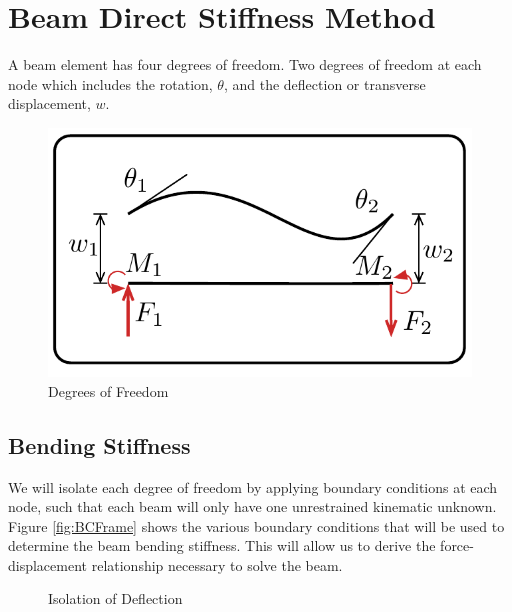 \section{Beam Direct Stiffness Method}

A beam element has four degrees of freedom. Two degrees of freedom at each node which includes the rotation, $\theta$, and the deflection or transverse displacement, $w$.

\begin{figure}[h]	
	\centerline{
		\includegraphics[width=0.7\columnwidth]{Figures/DeflectionandRotation}
		}
	\caption{Degrees of Freedom}
	\label{fig:DeflectionandRotation}
\end{figure}

\subsection{Bending Stiffness}

We will isolate each degree of freedom by applying boundary conditions at each node, such that each beam will only have one unrestrained kinematic unknown. Figure \ref{fig:BCFrame} shows the various boundary conditions that will be used to determine the beam bending stiffness. This will allow us to derive the force-displacement relationship necessary to solve the beam.


\begin{figure}[h]
\begin{center}
\caption{Isolation of Deflection}
\end{center}
\end{figure}

